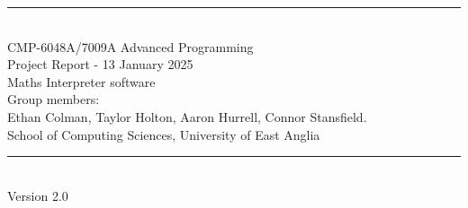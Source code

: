 \documentclass[a4paper, oneside, 11pt]{report}
\begin{document}
\begin{titlepage}
\begin{center}
\rule{12cm}{1mm} \\
\vspace{1cm}
{\large  CMP-6048A/7009A Advanced Programming} %
\vspace{7.5cm}
\\{\Large Project Report - 13 January 2025}
\vspace{1.5cm}
\\{\LARGE Maths Interpreter software} %
\vspace{1.0cm}
\\{\Large Group members: \\ Ethan Colman, Taylor Holton, Aaron Hurrell, Connor Stansfield.\ }
\vspace{10.0cm}
\\{\large School of Computing Sciences, University of East Anglia}
\\ \rule{12cm}{0.5mm}
\\ \hspace{8.5cm} {\large Version 2.0}
\end{center}
\end{titlepage}


\setcounter{page}{1}

\begin{abstract}
Please replace this section with your own abstract. An abstract is a brief summary (maximum 250 words) of your entire project. It should cover your objectives, your methodologies used, a brief developmental history, your final results, in particular covering the optional tasks, and a discussion and conclusion. You do not cover the literature or background in an abstract nor should you use abbreviations or acronyms. The remainder of this report template has clear chapter titles and we suggest to stick to these although you can organise your material inside each chapter to your own preferences. A guideline in size is approximately 3,500 words (not including abstract, captions and references) but no real limit on figures, tables, diagrams, pseudo-code etc.
\end{abstract}

\end{document}
